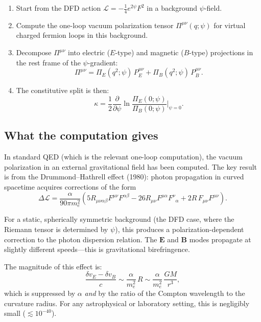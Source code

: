 \documentclass[11pt,a4paper]{article}
\newcommand{\vE}{\mathbf{E}}
\newcommand{\vB}{\mathbf{B}}
\begin{document}
\begin{enumerate}
\item Start from the DFD action $\mathcal{L} = -\frac{1}{4}e^{2\psi}F^2$
  in a background $\psi$-field.
\item Compute the one-loop vacuum polarization tensor
  $\Pi^{\mu\nu}(q; \psi)$ for virtual charged fermion loops in this
  background.
\item Decompose $\Pi^{\mu\nu}$ into electric ($E$-type) and magnetic
  ($B$-type) projections in the rest frame of the $\psi$-gradient:
  \begin{equation}
  \Pi^{\mu\nu} = \Pi_E(q^2;\psi)\,P_E^{\mu\nu}
  + \Pi_B(q^2;\psi)\,P_B^{\mu\nu}.
  \end{equation}
\item The constitutive split is then:
  \begin{equation}\label{eq:kappa-correct}
  \kappa = \frac{1}{2}\frac{\partial}{\partial\psi}
  \ln\frac{\Pi_E(0;\psi)}{\Pi_B(0;\psi)}\bigg|_{\psi=0}.
  \end{equation}
\end{enumerate}

\subsection{What the computation gives}

In standard QED (which is the relevant one-loop computation), the vacuum
polarization in an external gravitational field has been computed.  The
key result is from the Drummond--Hathrell effect (1980): photon
propagation in curved spacetime acquires corrections of the form
\begin{equation}
\Delta\mathcal{L} = \frac{\alpha}{90\pi m_e^2}
\left(5 R_{\mu\nu\alpha\beta}F^{\mu\nu}F^{\alpha\beta}
- 26 R_{\mu\nu}F^{\mu\alpha}F^\nu{}_\alpha
+ 2R\,F_{\mu\nu}F^{\mu\nu}\right).
\end{equation}

For a static, spherically symmetric background (the DFD case, where the
Riemann tensor is determined by $\psi$), this produces a polarization-dependent
correction to the photon dispersion relation.  The $\vE$ and $\vB$ modes
propagate at slightly different speeds---this is gravitational birefringence.

The magnitude of this effect is:
\begin{equation}
\frac{\delta v_E - \delta v_B}{c} \sim \frac{\alpha}{m_e^2}\,R
\sim \frac{\alpha}{m_e^2}\,\frac{GM}{r^3},
\end{equation}
which is suppressed by $\alpha$ \emph{and} by the ratio of the Compton
wavelength to the curvature radius.  For any astrophysical or laboratory
setting, this is negligibly small ($\lesssim 10^{-40}$).
\end{document}
